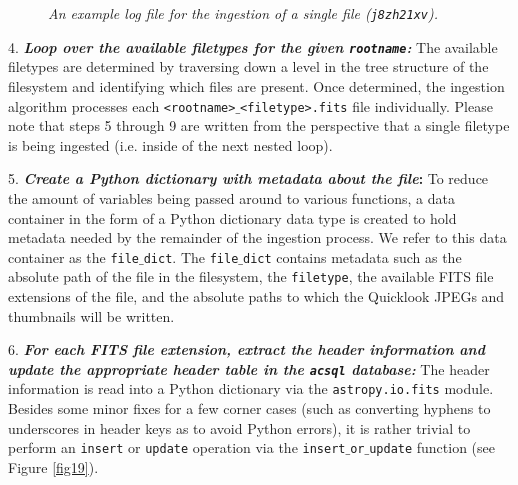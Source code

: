 \documentclass[10pt,journal,compsoc]{IEEEtran}
\begin{document}
\begin{figure}[!t]
\centering
{}
\caption{\textit{An example log file for the ingestion of a single file (\texttt{j8zh21xv}).}}
\label{fig20}
\end{figure}

4. \textbf{\textit{Loop over the available filetypes for the given \texttt{rootname}:}} The available filetypes are determined by traversing down a level in the tree
structure of the filesystem and identifying which files are present. Once determined, the ingestion algorithm processes each \texttt{<rootname>$\_$<filetype>.fits} file individually.
Please note that steps 5 through 9 are written from the perspective that a single filetype is being ingested (i.e. inside of the next nested loop).

5. \textbf{\textit{Create a Python dictionary with metadata about the file}:}  To reduce the amount of variables being passed around to various functions, a data container in the form of
a Python dictionary data type is created to hold metadata needed by the remainder of the ingestion process.  We refer to this data container as the \texttt{file$\_$dict}.  The
\texttt{file$\_$dict} contains metadata such as the absolute path of the file in the filesystem, the \texttt{filetype}, the available FITS file extensions of the file, and the absolute
paths to which the Quicklook JPEGs and thumbnails will be written.

6. \textbf{\textit{For each FITS file extension, extract the header information and update the appropriate header table in the \texttt{acsql} database:}}  The header information
is read into a Python dictionary via the \texttt{astropy.io.fits} module.  Besides some minor fixes for a few corner cases (such as converting hyphens to underscores in header keys as to avoid
Python errors), it is rather trivial to perform an \texttt{insert} or \texttt{update} operation via the \texttt{insert$\_$or$\_$update} function (see Figure \ref{fig19}).
\end{document}
